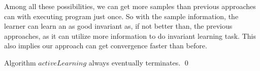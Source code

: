 








Among all these possibilities,
we can get more samples than previous approaches can with executing program just once.
So with the sample information, 
the learner can learn an as good invariant as, if not better than, the previous approaches, 
as it can utilize more information to do invariant learning task.
This also implies our approach can get convergence faster than before.











\begin{example}
\end{example}

\begin{proposition}
Algorithm $activeLearning$ always eventually terminates. \hfill \qed
\end{proposition}


\begin{example}
\end{example}


